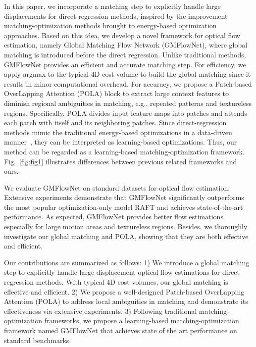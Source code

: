 \documentclass[10pt,twocolumn,letterpaper]{article}
\begin{document}
In this paper, we incorporate a matching step to explicitly handle large displacements for direct-regression methods, inspired by the improvement matching-optimization methods brought to energy-based optimization approaches.
Based on this idea, we develop a novel framework for optical flow estimation, namely Global Matching Flow Network (GMFlowNet), where global matching is introduced before the direct regression. 
Unlike traditional methods, GMFlowNet provides an efficient and accurate matching step.
For efficiency, we apply argmax to the typical 4D cost volume to build the global matching since it results in minor computational overhead. 
For accuracy, we propose a Patch-based OverLapping Attention  (POLA) block to extract large context features to diminish regional ambiguities in matching, e.g., repeated patterns and textureless regions. 
Specifically, POLA divides input feature maps into patches and attends each patch with itself and its neighboring patches. 
Since direct-regression methods mimic the traditional energy-based optimizations in a data-driven manner~\cite{teed2020raft}, they can be interpreted as learning-based optimizations. Thus, our method can be regarded as a learning-based matching-optimization framework. 
Fig.~\ref{fig:fig1} illustrates differences between previous related frameworks and ours.

We evaluate GMFlowNet on standard datasets for optical flow estimation.
Extensive experiments demonstrate that GMFlowNet significantly outperforms the most popular optimization-only model RAFT \cite{teed2020raft} and achieves state-of-the-art performance. 
As expected, GMFlowNet provides better flow estimations especially for large motion areas and textureless regions.
Besides, we thoroughly investigate our global matching and POLA, showing that they are both effective and efficient.


Our contributions are summarized as follows: 
1) We introduce a global matching step to explicitly handle large displacement optical flow estimations for direct-regression methods. With typical 4D cost volumes, our global matching is effective and efficient.
2) We propose a well-designed Patch-based OverLapping Attention (POLA) to address local ambiguities in matching and demonstrate its effectiveness via extensive experiments.
3) Following traditional matching-optimization frameworks, we propose a learning-based matching-optimization framework named GMFlowNet that achieves state of the art  performance on standard benchmarks.
\end{document}
